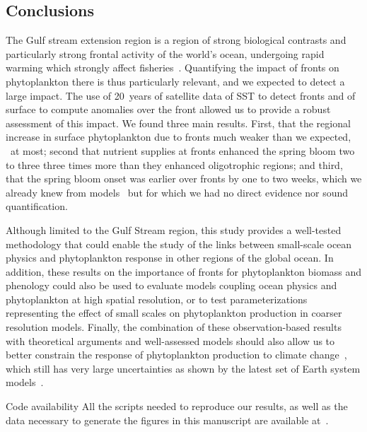 \subsection{Conclusions}

The Gulf stream extension region is a region of strong biological contrasts and particularly strong frontal activity of the world's ocean, undergoing rapid warming which strongly affect fisheries~\parencite{pershing_2015, neto_2021}.
Quantifying the impact of fronts on phytoplankton there is thus particularly relevant, and we expected to detect a large impact.
The use of 20~years of satellite data of SST to detect fronts and of surface  to compute anomalies over the front allowed us to provide a robust assessment of this impact.
We found three main results.
First, that the regional increase in surface phytoplankton due to fronts much weaker than we expected, ~at most; second that nutrient supplies at fronts enhanced the spring bloom two to three three times more than they enhanced oligotrophic regions; and third, that the spring bloom onset was earlier over fronts by one to two weeks, which we already knew from models~\parencite{karleskind_2011, mahadevan_2012} but for which we had no direct evidence nor sound quantification.

Although limited to the Gulf Stream region, this study provides a well-tested methodology that could enable the study of the links between small-scale ocean physics and phytoplankton response in other regions of the global ocean.
In addition, these results on the importance of fronts for phytoplankton biomass and phenology could also be used to evaluate models coupling ocean physics and phytoplankton at high spatial resolution, or to test parameterizations representing the effect of small scales on phytoplankton production in coarser resolution models.
Finally, the combination of these observation-based results with theoretical arguments and well-assessed models should also allow us to better constrain the response of phytoplankton production to climate change~\parencite{couespel_2021}, which still has very large uncertainties as shown by the latest set of Earth system models~\parencite{kwiatkowski_2020}.


\begin{articleSubBlock}{Code availability}
  All the scripts needed to reproduce our results, as well as the data necessary to generate the figures in this manuscript are available at~\textcite{haeck_2022_zenodo}.
\end{articleSubBlock}


